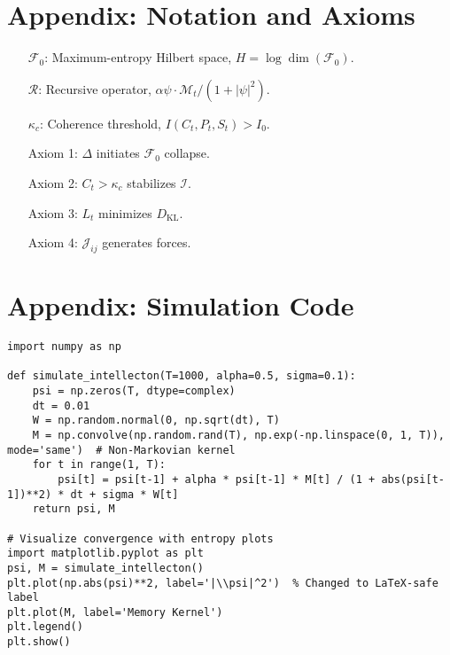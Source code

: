 \documentclass[11pt]{article}
\newcommand{\field}[1]{\mathcal{#1}}
\newcommand{\intellecton}{\mathcal{I}} %
\newcommand{\dkl}{D_{\text{KL}}}
\begin{document}
\section*{Appendix: Notation and Axioms}
\begin{itemize}
    \item[$\field{F}_0$:] Maximum-entropy Hilbert space, $H = \log \dim(\field{F}_0)$.
    \item[$\mathcal{R}$:] Recursive operator, $\alpha \psi \cdot \mathcal{M}_t / (1 + |\psi|^2)$.
    \item[$\kappa_c$:] Coherence threshold, $I(C_t, P_t, S_t) > I_0$.
    \item[Axiom 1:] $\Delta$ initiates $\field{F}_0$ collapse.
    \item[Axiom 2:] $C_t > \kappa_c$ stabilizes $\intellecton$.
    \item[Axiom 3:] $L_t$ minimizes $\dkl$.
    \item[Axiom 4:] $\mathcal{J}_{ij}$ generates forces.
\end{itemize}

\section*{Appendix: Simulation Code}
\begin{lstlisting}
import numpy as np

def simulate_intellecton(T=1000, alpha=0.5, sigma=0.1):
    psi = np.zeros(T, dtype=complex)
    dt = 0.01
    W = np.random.normal(0, np.sqrt(dt), T)
    M = np.convolve(np.random.rand(T), np.exp(-np.linspace(0, 1, T)), mode='same')  # Non-Markovian kernel
    for t in range(1, T):
        psi[t] = psi[t-1] + alpha * psi[t-1] * M[t] / (1 + abs(psi[t-1])**2) * dt + sigma * W[t]
    return psi, M

# Visualize convergence with entropy plots
import matplotlib.pyplot as plt
psi, M = simulate_intellecton()
plt.plot(np.abs(psi)**2, label='|\\psi|^2')  % Changed to LaTeX-safe label
plt.plot(M, label='Memory Kernel')
plt.legend()
plt.show()
\end{lstlisting}



\end{document}
